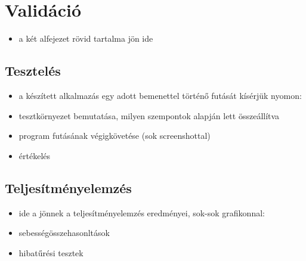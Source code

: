 \chapter{Validáció}
\begin{itemize}
  \item a két alfejezet rövid tartalma jön ide
\end{itemize}

\section{Tesztelés}
\begin{itemize}
  \item a készített alkalmazás egy adott bemenettel történő futását kísérjük nyomon:
  \item tesztkörnyezet bemutatása, milyen szempontok alapján lett összeállítva
  \item program futásának végigkövetése (sok screenshottal)
  \item értékelés
\end{itemize}

\section{Teljesítményelemzés}
\begin{itemize}
  \item ide a jönnek a teljesítményelemzés eredményei, sok-sok grafikonnal:
  \item sebességösszehasonltások
  \item hibatűrési tesztek
\end{itemize}